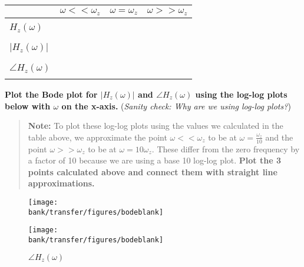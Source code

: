 \begin{enumerate}
\begin{enumerate}
    \begin{table}[ht!]
      \centering
      \begin{tabular}{| l | >{\centering\arraybackslash}m{6em} | >{\centering\arraybackslash}m{6em} | >{\centering\arraybackslash}m{6em} |} 
      \cline{2-4}
      \multicolumn{1}{l|}{}& $\omega << \omega_z$ & $\omega = \omega_z$ & $\omega >> \omega_z$ \\
      \hline
      &&&\\
      $H_z(\omega)$        &                      &                     &                      \\
      &&&\\
      \hline
      &&&\\
      $|H_z(\omega)|$      &                      &                     &                      \\
      &&&\\
      \hline
      &&&\\
      $\angle H_z(\omega)$ &                      &                     &                      \\
      &&&\\
      \hline
      \end{tabular}
    \end{table}

    \qitem \textbf{Plot the Bode plot for $|H_z(\omega)|$ and $\angle H_z(\omega)$ using the log-log plots below with $\omega$ on the x-axis.} (\textit{Sanity check: Why are we using log-log plots?})

    \begin{quote}
    \textbf{Note:} To plot these log-log plots using the values we calculated in the table above, we approximate the point $\omega << \omega_z$
    to be at $\omega = \frac{\omega_z}{10}$ and the point $\omega >> \omega_z$ to be at $\omega = 10\omega_z$.
    These differ from the zero frequency by a factor of 10 because we are using a base 10 log-log plot. \textbf{Plot the 3 points calculated above and connect them with straight line approximations.}
    \end{quote}

\end{enumerate}

\begin{figure}[!ht]
  \centering
  \begin{minipage}[b]{0.45\textwidth}
  \texttt{[image: \\bank/transfer/figures/bodeblank]}
    \caption*{$|H_z(\omega)|$}
  \end{minipage}
  \hfill
  \begin{minipage}[b]{0.45\textwidth}
  \texttt{[image: \\bank/transfer/figures/bodeblank]}
    \caption*{$\angle H_z(\omega)$}
  \end{minipage}
\end{figure}


\end{enumerate}
